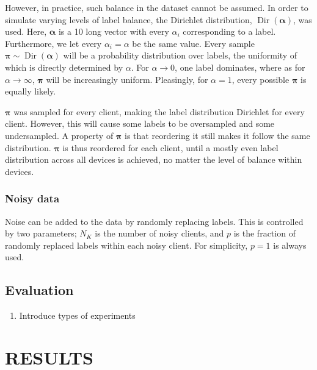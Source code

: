 \documentclass{article}
\begin{document}
However, in practice, such balance in the dataset cannot be assumed.
In order to simulate varying levels of label balance, the Dirichlet distribution, $\operatorname{Dir}(\bm\alpha)$, was used.
Here, $\bm\alpha$ is a 10 long vector with every $\alpha_i$ corresponding to a label.
Furthermore, we let every $\alpha_i=\alpha$ be the same value.
Every sample $\bm\pi\sim\operatorname{Dir}(\bm\alpha)$ will be a probability distribution over labels, the uniformity of which is directly determined by $\alpha$.
For $\alpha\to0$, one label dominates, where as for $\alpha\to\infty$, $\bm\pi$ will be increasingly uniform.
Pleasingly, for $\alpha=1$, every possible $\bm\pi$ is equally likely.

$\bm\pi$ was sampled for every client, making the label distribution Dirichlet for every client.
However, this will cause some labels to be oversampled and some undersampled.
A property of $\bm\pi$ is that reordering it still makes it follow the same distribution.
$\bm\pi$ is thus reordered for each client, until a mostly even label distribution across all devices is achieved, no matter the level of balance within devices.

\subsubsection{Noisy data}
Noise can be added to the data by randomly replacing labels.
This is controlled by two parameters; $N_K$ is the number of noisy clients, and $p$ is the fraction of randomly replaced labels within each noisy client.
For simplicity, $p=1$ is always used.

\subsection{Evaluation}
\begin{enumerate}
    \item Introduce types of experiments
\end{enumerate}

\section{RESULTS}%
\label{sec:results}
\end{document}
